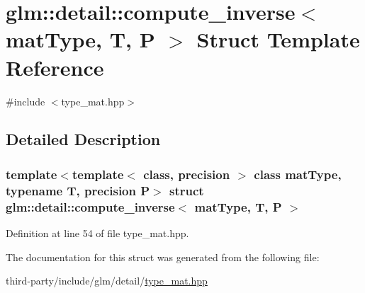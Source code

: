 \hypertarget{structglm_1_1detail_1_1compute__inverse}{}\section{glm\+:\+:detail\+:\+:compute\+\_\+inverse$<$ mat\+Type, T, P $>$ Struct Template Reference}
\label{structglm_1_1detail_1_1compute__inverse}


{\ttfamily \#include $<$type\+\_\+mat.\+hpp$>$}



\subsection{Detailed Description}
\subsubsection*{template$<$template$<$ class, precision $>$ class mat\+Type, typename T, precision P$>$\newline
struct glm\+::detail\+::compute\+\_\+inverse$<$ mat\+Type, T, P $>$}



Definition at line 54 of file type\+\_\+mat.\+hpp.



The documentation for this struct was generated from the following file\+:\begin{DoxyCompactItemize}
\item 
third-\/party/include/glm/detail/\hyperlink{type__mat_8hpp}{type\+\_\+mat.\+hpp}\end{DoxyCompactItemize}
